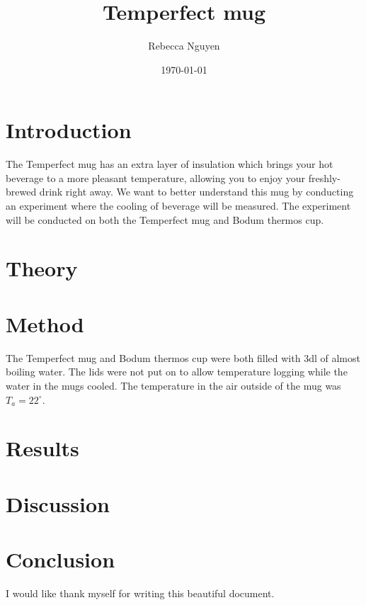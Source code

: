 \documentclass[reprint,english,notitlepage]{revtex4-2}
\begin{document}
\title{Temperfect mug}   %
\author{Rebecca Nguyen}               %
\date{\today}                             %
\noaffiliation
\maketitle                                %


\section{Introduction}
The Temperfect mug has an extra layer of insulation which brings your hot beverage
to a more pleasant temperature, allowing you to enjoy your freshly-brewed drink right away.
We want to better understand this mug by conducting an experiment where the
cooling of beverage will be measured. The experiment will be conducted on both the Temperfect mug and Bodum thermos cup.

\section{Theory}
\section{Method}
The Temperfect mug and Bodum thermos cup were both filled with 3dl of almost boiling water. The lids were not put on to allow temperature logging while the water in the mugs cooled. The temperature in the air outside of the mug was $T_a = 22^{\circ}$. 
\section{Results}
\section{Discussion}
\section{Conclusion}

\begin{acknowledgments}
I would like thank myself for writing this beautiful document.
\end{acknowledgments}


\end{document}
